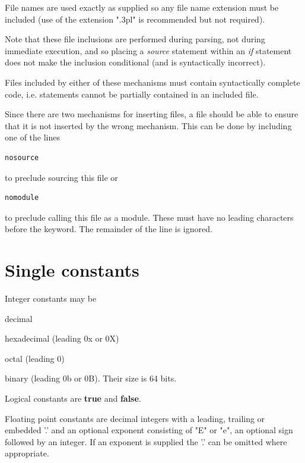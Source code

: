         File names are used exactly as supplied so any file name extension
        must be included (use of the extension ".3pl" is recommended but not
        required).

        Note that these file inclusions are performed during parsing, not during
        immediate execution, and so placing a {\em source} statement within
        an {\em if} statement does not make the inclusion conditional (and
        is syntactically incorrect).
        
        Files included by either of these mechanisms must contain syntactically
        complete code, i.e. statements cannot be partially contained in an
        included file.
        
        Since there are two mechanisms for inserting files, a file should
        be able to ensure that it is not inserted by the wrong mechanism.
        This can be done by including one of the lines
        \begin{lstlisting}[gobble=8, language=threepl]
           nosource
        \end{lstlisting}
        to preclude sourcing this file or
        \begin{lstlisting}[gobble=8, language=threepl]
           nomodule
        \end{lstlisting}
        to preclude calling this file as a module.
        These must have no leading characters before the keyword. The remainder
        of the line is ignored. 



    \section{Single constants}

        Integer constants may be
        \blist
        \item    decimal
        \item    hexadecimal (leading 0x or 0X)
        \item    octal (leading 0)
        \item    binary (leading 0b or 0B).
        \blend
        Their size is 64 bits.

        Logical constants are {\bf true} and {\bf false}.

        Floating point constants are decimal integers with a leading,
        trailing or embedded '.' and an optional exponent consisting of "E"
        or "e", an optional sign followed by an integer. If an exponent is
        supplied the '.' can be omitted where appropriate.

